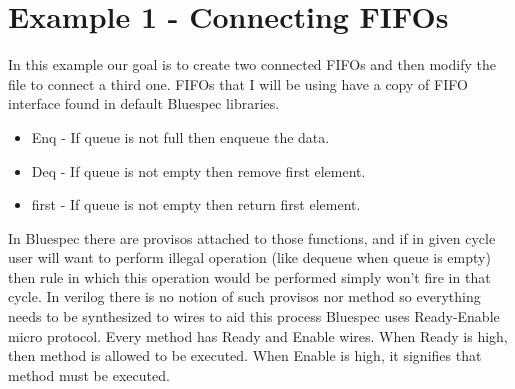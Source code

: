 \documentclass[14pt]{report}
\begin{document}
\section{Example 1 - Connecting FIFOs}
In this example our goal is to create two connected FIFOs and then modify the file to connect a third one. FIFOs that I will be using have a copy of FIFO interface found in default Bluespec libraries.
\begin{itemize}
    \item Enq - If queue is not full then enqueue the data.
    \item Deq - If queue is not empty then remove first element.
    \item first - If queue is not empty then return first element.
\end{itemize}
In Bluespec there are provisos attached to those functions, and if in given cycle user will want to perform illegal operation (like dequeue when queue is empty) then rule in which this operation would be performed simply won't fire in that cycle. In verilog there is no notion of such provisos nor method so everything needs to be synthesized to wires to aid this process Bluespec uses Ready-Enable micro protocol. Every method has Ready and Enable wires. When Ready is high, then method is allowed to be executed. When Enable is high, it signifies that method must be executed.
\end{document}
